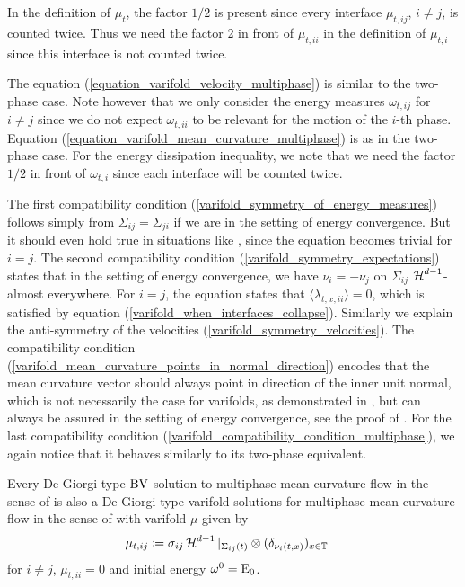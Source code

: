 In the definition of $ \mu_{ t } $, the factor $1/2$ is present since every 
interface $ \mu_{ t , i j } $, $ i \neq j $, is counted twice. Thus we need the 
factor 2 in front of $ \mu_{ t , i i } $ in the definition of $ \mu_{ t , i } $
since this interface is not counted twice.

The equation (\ref{equation_varifold_velocity_multiphase}) is similar to the 
two-phase case. Note however that we only consider the energy measures $ 
\omega_{ t , i j } $ for $ i \neq j $ since we do not expect $ \omega_{ t , i i 
} $ to be relevant for the motion of the $ i $-th phase. Equation
(\ref{equation_varifold_mean_curvature_multiphase}) is as in the two-phase 
case. For the energy dissipation inequality, we note that we need the factor $ 
1/2 $ in front of $ \omega_{ t , i } $ since each interface will be counted 
twice. 

The first compatibility condition (\ref{varifold_symmetry_of_energy_measures}) 
follows simply from $ \Sigma_{ i j } = \Sigma_{ j i } $ if we are in the 
setting of energy convergence. But it should even hold true in situations like 
, since the equation becomes trivial for $ i = 
j $. 
The second compatibility condition 
(\ref{varifold_symmetry_expectations}) states that in the setting of energy 
convergence, we have $ \nu_{ i } = - \nu_{ j } $ on $ \Sigma_{ i j } $ $ \operatorname{\mathcal{H}}^{ 
	d -1 } $-almost everywhere. For $ i = j $, the equation states that 
$ \langle \lambda_{ t , x , i i } \rangle = 0 $, which is satisfied by equation
(\ref{varifold_when_interfaces_collapse}). 
Similarly we explain the anti-symmetry of the velocities 
(\ref{varifold_symmetry_velocities}). The compatibility condition 
(\ref{varifold_mean_curvature_points_in_normal_direction}) encodes that the 
mean curvature vector should always point in direction of the inner unit 
normal, which is not necessarily the case for varifolds, as demonstrated in 
, but 
can always be assured in the setting of energy convergence, see the proof of
. 
For the last compatibility condition 
(\ref{varifold_compatibility_condition_multiphase}), we again notice that it 
behaves similarly to its two-phase equivalent.

\begin{theorem}
	\label{bv_solutions_are_varifold_solutions}
	Every  De Giorgi type $ \operatorname{BV} $-solution to multiphase mean curvature 
	flow in the sense of  is also a De Giorgi 
	type varifold solutions for multiphase mean curvature flow in the sense of
	 with varifold $ \mu $ given by
	\begin{align*}
		\mu_{ t, ij  }
		& \coloneqq
		\sigma_{ i j }
		\operatorname{\mathcal{H}}^{ d- 1 }|_{ \Sigma_{ i j } ( t ) }
		\otimes
		( \delta_{ \nu_{ i } ( t, x ) } )_{ x \in \operatorname{\mathbb{T}} }
	\end{align*} 
	for $ i \neq j $, $
	\mu_{ t , i i } = 0 $ and initial energy $ \omega^{ 0 } 
	= \operatorname{E}_{ 0 } $.
\end{theorem}

